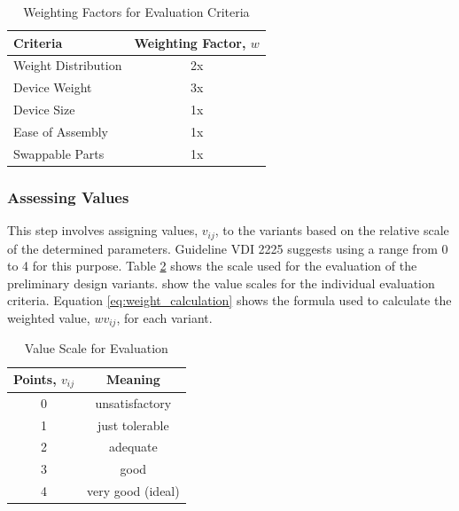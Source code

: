 \begin{table}[!h]
    \centering
    \begin{tabular}{|l|c|}
        \hline
        \textbf{Criteria}   & \textbf{Weighting Factor, $w$} \\ \hline
        Weight Distribution & 2x                             \\ \hline
        Device Weight       & 3x                             \\ \hline
        Device Size         & 1x                             \\ \hline
        Ease of Assembly    & 1x                             \\ \hline
        Swappable Parts     & 1x                             \\ \hline
    \end{tabular}
    \caption{Weighting Factors for Evaluation Criteria}
    \label{tab:weighting}
\end{table}

\subsubsection{Assessing Values}
This step involves assigning values, $v_{ij}$, to the variants based on the relative scale of the determined parameters. Guideline VDI 2225 suggests using a range from 0 to 4 for this purpose. Table \ref{tab:value_scale} shows the scale used for the evaluation of the preliminary design variants.  show the value scales for the individual evaluation criteria. Equation \ref{eq:weight_calculation} shows the formula used to calculate the weighted value, $wv_{ij}$, for each variant.

\begin{table}[!h]
    \centering
    \begin{tabular}{|c|c|}
        \hline
        \textbf{Points, $v_{ij}$} & \textbf{Meaning}  \\ \hline
        0                         & unsatisfactory    \\ \hline
        1                         & just tolerable    \\ \hline
        2                         & adequate          \\ \hline
        3                         & good              \\ \hline
        4                         & very good (ideal) \\ \hline
    \end{tabular}
    \caption{Value Scale for Evaluation \cite{Pahl07ad}}
    \label{tab:value_scale}
\end{table}

